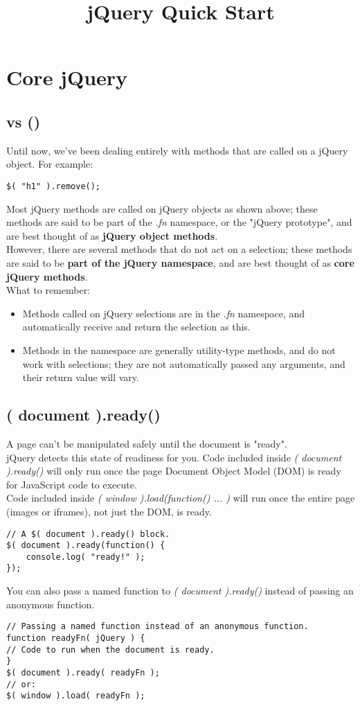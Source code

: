 \documentclass[10pt,letterpaper]{report}
\begin{document}
\title{jQuery Quick Start}
\maketitle
\tableofcontents
\chapter{Core jQuery}
\section{\textdollar vs \textdollar()}
Until now, we've been dealing entirely with methods that are called on a jQuery object. For example:
\begin{lstlisting}
$( "h1" ).remove();
\end{lstlisting}
Most jQuery methods are called on jQuery objects as shown above; these methods are said to be part of the \textit{\textdollar.fn} namespace, or the "jQuery prototype", and are best thought of as \textbf{jQuery object methods}.\\
However, there are several methods that do not act on a selection; these methods are said to be \textbf{part of the jQuery namespace}, and are best thought of as \textbf{core jQuery methods}.\\
What to remember:

\begin{itemize}
\item Methods called on jQuery selections are in the \textit{\textdollar.fn} namespace, and automatically receive and return the selection as this.
\item Methods in the \textdollar namespace are generally utility-type methods, and do not work with selections; they are not automatically passed any arguments, and their return value will vary.
\end{itemize}
\section{\textdollar( document ).ready()}
A page can't be manipulated safely until the document is "ready".\\
jQuery detects this state of readiness for you. Code included inside \textit{\textdollar( document ).ready()} will only run once the page Document Object Model (DOM) is ready for JavaScript code to execute.\\
Code included inside \textit{\textdollar( window ).load(function() { ... })} will run once the entire page (images or iframes), not just the DOM, is ready.
\begin{lstlisting}
// A $( document ).ready() block.
$( document ).ready(function() {
	console.log( "ready!" );
});
\end{lstlisting}
You can also pass a named function to \textit{\textdollar( document ).ready()} instead of passing an anonymous function.
\begin{lstlisting}
// Passing a named function instead of an anonymous function.
function readyFn( jQuery ) {
// Code to run when the document is ready.
}
$( document ).ready( readyFn );
// or:
$( window ).load( readyFn );
\end{lstlisting}
\end{document}
